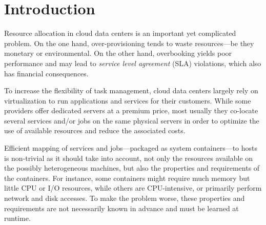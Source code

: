 
\chapter{Introduction}
\label{chap:introduction}



Resource allocation in cloud data centers is an important yet complicated problem.
On the one hand, over-provisioning tends to waste resources---be they monetary or environmental.
On the other hand, overbooking yields poor performance and may lead to \emph{service level agreement} (SLA) violations, which also has financial consequences.

To increase the flexibility of task management, cloud data centers largely rely on virtualization to run applications and services for their customers.
While some providers offer dedicated servers at a premium price, most usually they co-locate several services and/or jobs on the same physical servers in order to optimize the use of available resources and reduce the associated costs.

Efficient mapping of services and jobs---packaged as system containers---to hosts is non-trivial as it should take into account, not only the resources available on the possibly heterogeneous machines, but also the properties and requirements of the containers.
For instance, some containers might require much memory but little CPU or I/O resources, while others are CPU-intensive, or primarily perform network and disk accesses.
To make the problem worse, these properties and requirements are not necessarily known in advance and must be learned at runtime.

